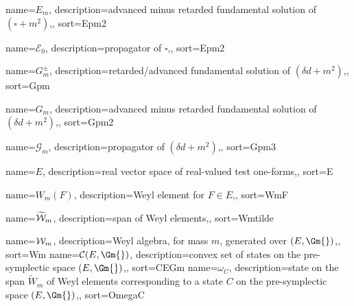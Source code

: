 {
	name=\ensuremath{E_m},
	description={advanced minus retarded fundamental solution of $(\square + m^2)$,},
	sort={Epm2}
}

{
		name=\ensuremath{\mathcal{E}_0},
		description={propagator of $\square$,},
		sort={Epm2}
}

{
	name=\ensuremath{G_m^\pm},
	description={retarded/advanced fundamental solution of $(\delta d + m^2)$,},
	sort={Gpm}
}

{
	name=\ensuremath{G_m},
	description={advanced minus retarded fundamental solution of $(\delta d + m^2)$,},
	sort={Gpm2}
}

{
	name=\ensuremath{\mathcal{G}_m},
	description={propagator of $(\delta d + m^2)$,},
	sort={Gpm3}
}








{
	name=\ensuremath{E},
	description={real vector space of real-valued test one-forms,},
	sort={E}
}


{
	name=\ensuremath{W_m(F)},
	description={Weyl element for $F \in E$,},
	sort={WmF}
}

{
	name=\ensuremath{\widetilde{\W}_m},
	description={span of Weyl elements,},
	sort={Wmtilde}
}

{
	name=\ensuremath{\W_m},
	description={Weyl algebra, for mass $m$, generated over $(E,\Gm{})$,},
	sort={Wm}
}
{
	name=\ensuremath{\mathcal{C}(E,\Gm{})},
	description={convex set of states on the pre-symplectic space $(E,\Gm{})$,},
	sort={CEGm}
}
{
	name=\ensuremath{\omega_C},
	description={state on the span $\widetilde{W}_m$ of Weyl elements corresponding to a state $C$ on the pre-symplectic space $(E,\Gm{})$,},
	sort={OmegaC}
}